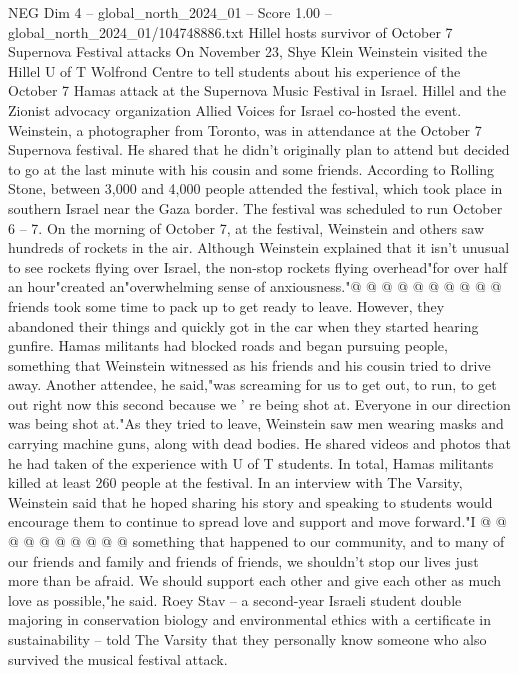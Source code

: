 \begin{textsample}{NEG Dim 4 – global\_north\_2024\_01 – Score 1.00 – global\_north\_2024\_01/104748886.txt}  \label{ex:f4_neg_126}
Hillel hosts survivor of October 7 Supernova Festival attacks On November 23, Shye Klein Weinstein visited the Hillel U of T Wolfrond Centre to tell students about his experience of the October 7 Hamas attack at the Supernova Music Festival in Israel.
Hillel and the Zionist advocacy organization Allied Voices for Israel co-hosted the event.
Weinstein, a photographer from Toronto, was in attendance at the October 7 Supernova festival.
He shared that he didn't originally plan to attend but decided to go at the last minute with his cousin and some friends.
According to Rolling Stone, between 3,000 and 4,000 people attended the festival, which took place in southern Israel near the Gaza border.
The festival was scheduled to run October 6 -- 7.
On the morning of October 7, at the festival, Weinstein and others saw hundreds of rockets in the air.
Although Weinstein explained that it isn't unusual to see rockets flying over Israel, the non-stop rockets flying overhead"for over half an hour"created an"overwhelming sense of anxiousness."@ @ @ @ @ @ @ @ @ @ friends took some time to pack up to get ready to leave.
However, they abandoned their things and quickly got in the car when they started hearing gunfire.
Hamas militants had blocked roads and began pursuing people, something that Weinstein witnessed as his friends and his cousin tried to drive away.
Another attendee, he said,"was screaming for us to get out, to run, to get out right now this second because we ' re being shot at.
Everyone in our direction was being shot at."As they tried to leave, Weinstein saw men wearing masks and carrying machine guns, along with dead bodies.
He shared videos and photos that he had taken of the experience with U of T students.
In total, Hamas militants killed at least 260 people at the festival.
In an interview with The Varsity, Weinstein said that he hoped sharing his story and speaking to students would encourage them to continue to spread love and support and move forward."I @ @ @ @ @ @ @ @ @ @ something that happened to our community, and to many of our friends and family and friends of friends, we shouldn't stop our lives just more than be afraid.
We should support each other and give each other as much love as possible,"he said.
Roey Stav -- a second-year Israeli student double majoring in conservation biology and environmental ethics with a certificate in sustainability -- told The Varsity that they personally know someone who also survived the musical festival attack.

\end{textsample}
